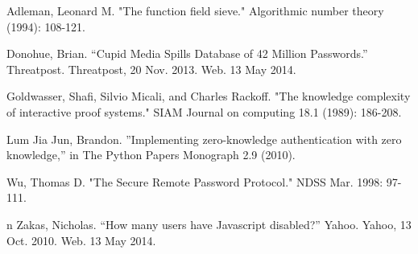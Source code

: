 \documentclass[11pt]{article}
\begin{document}
\begin{thebibliography}{9}
Adleman, Leonard M. "The function field sieve." Algorithmic number theory (1994): 108-121.

Donohue, Brian. “Cupid Media Spills Database of 42 Million Passwords.” Threatpost. Threatpost, 20 Nov. 2013. Web. 13 May 2014.

Goldwasser, Shafi, Silvio Micali, and Charles Rackoff. "The knowledge complexity of interactive proof systems." SIAM Journal on computing 18.1 (1989): 186-208.

Lum Jia Jun, Brandon. ”Implementing zero-knowledge authentication with zero knowledge,” in The Python Papers Monograph 2.9 (2010).

Wu, Thomas D. "The Secure Remote Password Protocol." NDSS Mar. 1998: 97-111.

n
Zakas, Nicholas. “How many users have Javascript disabled?” Yahoo. Yahoo, 13 Oct. 2010. Web. 13 May 2014.

\end{thebibliography}
\end{document}
